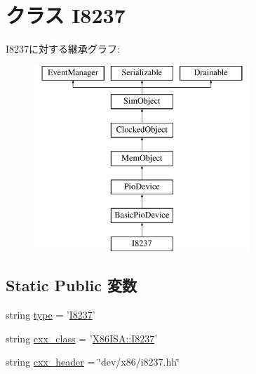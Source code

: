 \hypertarget{classI8237_1_1I8237}{
\section{クラス I8237}
\label{classI8237_1_1I8237}
}
I8237に対する継承グラフ:\begin{figure}[H]
\begin{center}
\leavevmode
\includegraphics[height=7cm]{classI8237_1_1I8237}
\end{center}
\end{figure}
\subsection*{Static Public 変数}
\begin{DoxyCompactItemize}
\item 
string \hyperlink{classI8237_1_1I8237_acce15679d830831b0bbe8ebc2a60b2ca}{type} = '\hyperlink{classI8237_1_1I8237}{I8237}'
\item 
string \hyperlink{classI8237_1_1I8237_a58cd55cd4023648e138237cfc0822ae3}{cxx\_\-class} = '\hyperlink{classX86ISA_1_1I8237}{X86ISA::I8237}'
\item 
string \hyperlink{classI8237_1_1I8237_a17da7064bc5c518791f0c891eff05fda}{cxx\_\-header} = \char`\"{}dev/x86/i8237.hh\char`\"{}
\end{DoxyCompactItemize}


